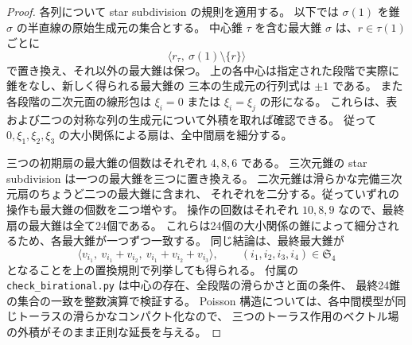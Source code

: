 \begin{proof}
各列について star subdivision の規則を適用する。
以下では $\sigma(1)$ を錐 $\sigma$ の半直線の原始生成元の集合とする。
中心錐 $\tau$ を含む最大錐 $\sigma$ は、$r\in\tau(1)$ ごとに
\[
 \bigl\langle r_\tau,\ \sigma(1)\setminus\{r\}\bigr\rangle
\]
で置き換え、それ以外の最大錐は保つ。
上の各中心は指定された段階で実際に錐をなし、新しく得られる最大錐の
三本の生成元の行列式は $\pm1$ である。
また各段階の二次元面の線形包は
$\xi_i=0$ または $\xi_i=\xi_j$ の形になる。
これらは、表および二つの対称な列の生成元について外積を取れば確認できる。
従って $0,\xi_1,\xi_2,\xi_3$ の大小関係による扇は、全中間扇を細分する。

三つの初期扇の最大錐の個数はそれぞれ $4,8,6$ である。
三次元錐の star subdivision は一つの最大錐を三つに置き換える。
二次元錐は滑らかな完備三次元扇のちょうど二つの最大錐に含まれ、
それぞれを二分する。従っていずれの操作も最大錐の個数を二つ増やす。
操作の回数はそれぞれ $10,8,9$ なので、最終扇の最大錐は全て24個である。
これらは24個の大小関係の錐によって細分されるため、各最大錐が一つずつ一致する。
同じ結論は、最終最大錐が
\[
 \bigl\langle
 v_{i_1},\ v_{i_1}+v_{i_2},\ v_{i_1}+v_{i_2}+v_{i_3}
 \bigr\rangle,
 \qquad (i_1,i_2,i_3,i_4)\in\mathfrak S_4
\]
となることを上の置換規則で列挙しても得られる。
付属の \texttt{check\_birational.py} は中心の存在、全段階の滑らかさと面の条件、
最終24錐の集合の一致を整数演算で検証する。
Poisson 構造については、各中間模型が同じトーラスの滑らかなコンパクト化なので、
三つのトーラス作用のベクトル場の外積がそのまま正則な延長を与える。
\end{proof}

